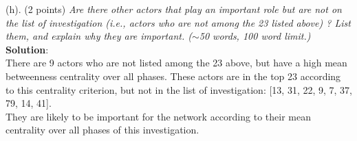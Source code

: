 (h). (2 points) \textsl{Are there other actors that play an important role but are not on the list of investigation (i.e., actors who are not among the 23 listed above) ? List them, and explain why they are important. ($\sim$50 words, 100 word limit.)}\\

\textbf{Solution}:\\
There are 9 actors who are not listed among the 23 above, but have a high mean betweenness centrality over all phases. These actors are in the top 23 according to this centrality criterion, but not in the list of investigation: [13, 31, 22, 9, 7, 37, 79, 14, 41].\\

They are likely to be important for the network according to their mean centrality over all phases of this investigation.\\